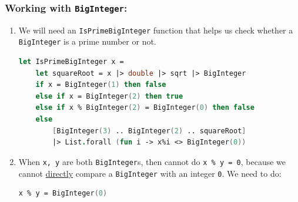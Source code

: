 \documentclass[12pt]{article}
\begin{document}
\subsubsection*{Working with \texttt{BigInteger}:}
\begin{enumerate}
\item We will need an \texttt{IsPrimeBigInteger} function that helps us check whether a \texttt{BigInteger} is a prime number or not.
\begin{lstlisting}[language=FSharp]
let IsPrimeBigInteger x =
    let squareRoot = x |> double |> sqrt |> BigInteger 
    if x = BigInteger(1) then false
    else if x = BigInteger(2) then true
    else if x % BigInteger(2) = BigInteger(0) then false
    else 
        [BigInteger(3) .. BigInteger(2) .. squareRoot]
        |> List.forall (fun i -> x%i <> BigInteger(0))
\end{lstlisting}
\item When \texttt{x, y} are both \texttt{BigInteger}s, then cannot do \texttt{x \% y = 0}, because we cannot \underline{directly} compare a \texttt{BigInteger} with an integer \texttt{0}. We need to do:
\begin{lstlisting}[language=FSharp]
x % y = BigInteger(0)
\end{lstlisting}
\end{enumerate}
\end{document}
